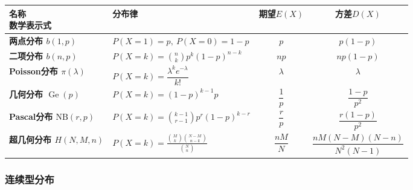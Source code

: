 \documentclass[UTF8,fontset=fandol,zihao=5]{ctexart}
\begin{document}
\begin{center}
  \begin{tabularx}{0.92\textwidth}{
    >{\centering\arraybackslash\bfseries}p{2.3cm}
    >{\centering\arraybackslash}X c c
  }
    \toprule
    \shortstack[c]{名称\\数学表示式} & 分布律 & 期望$E(X)$ & 方差$D(X)$ \\
    \midrule
    \shortstack[c]{两点分布\\$b(1,p)$}
    & $\displaystyle P(X=1)=p,\ P(X=0)=1-p$ & $p$ & $p(1-p)$ \\

    \shortstack[c]{二项分布\\$b(n,p)$}
    & $\displaystyle P(X=k)=\binom{n}{k}p^k(1-p)^{n-k}$ & $np$ & $np(1-p)$ \\

    \shortstack[c]{Poisson分布\\$\pi(\lambda)$}
    & $\displaystyle P(X=k)=\dfrac{\lambda^k e^{-\lambda}}{k!}$ & $\lambda$ & $\lambda$ \\

    \shortstack[c]{几何分布\\$\operatorname{Ge}(p)$}
    & $\displaystyle P(X=k)=(1-p)^{k-1}p$ & $\dfrac{1}{p}$ & $\dfrac{1-p}{p^2}$ \\

    \shortstack[c]{Pascal分布\\$\mathrm{NB}(r,p)$}
    & $\displaystyle P(X=k)=\binom{k-1}{r-1}p^r(1-p)^{k-r}$
    & $\dfrac{r}{p}$ & $\dfrac{r(1-p)}{p^2}$ \\

    \shortstack[c]{超几何分布\\$H(N,M,n)$}
    & $\displaystyle P(X=k)=\frac{\binom{M}{k}\binom{N-M}{n-k}}{\binom{N}{n}}$
    & $\dfrac{nM}{N}$ & $\dfrac{nM(N-M)(N-n)}{N^2(N-1)}$ \\
    \bottomrule
  \end{tabularx}
\end{center}

\subsubsection{连续型分布}
\end{document}
